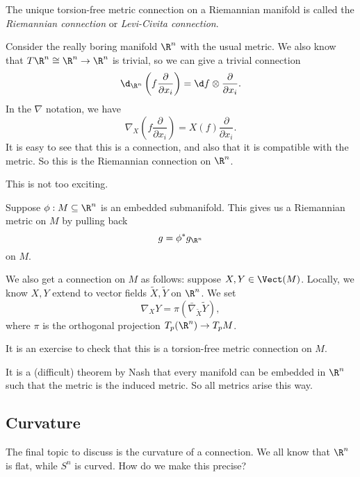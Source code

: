\documentclass[a4paper]{article}
\begin{document}
\begin{defi}
  The unique torsion-free metric connection on a Riemannian manifold is called the \emph{Riemannian connection} or \emph{Levi-Civita connection}.
\end{defi}

\begin{eg}
  Consider the really boring manifold $\R^n$ with the usual metric. We also know that $T\R^n \cong \R^n \to \R^n$ is trivial, so we can give a trivial connection
  \[
    \d_{\R^n} \left(f \frac{\partial}{\partial x_i}\right) = \d f \otimes \frac{\partial}{\partial x_i}.
  \]
  In the $\nabla$ notation, we have
  \[
    \nabla_X \left(f \frac{\partial}{\partial x_i}\right) = X(f) \frac{\partial}{\partial x_i}.
  \]
  It is easy to see that this is a connection, and also that it is compatible with the metric. So this is the Riemannian connection on $\R^n$.
\end{eg}
This is not too exciting.
\begin{eg}
  Suppose $\phi: M \subseteq \R^n$ is an embedded submanifold. This gives us a Riemannian metric on $M$ by pulling back
  \[
    g = \phi^* g_{\R^n}
  \]
  on $M$.

  We also get a connection on $M$ as follows: suppose $X, Y \in \Vect(M)$. Locally, we know $X, Y$ extend to vector fields $\tilde{X}, \tilde{Y}$ on $\R^n$. We set
  \[
    \nabla_X Y = \pi (\bar\nabla_{\tilde{X}} \tilde{Y}),
  \]
  where $\pi$ is the orthogonal projection $T_p(\R^n) \to T_pM$.

  It is an exercise to check that this is a torsion-free metric connection on $M$.
\end{eg}

It is a (difficult) theorem by Nash that every manifold can be embedded in $\R^n$ such that the metric is the induced metric. So all metrics arise this way.

\subsection{Curvature}
The final topic to discuss is the curvature of a connection. We all know that $\R^n$ is flat, while $S^n$ is curved. How do we make this precise?
\end{document}
